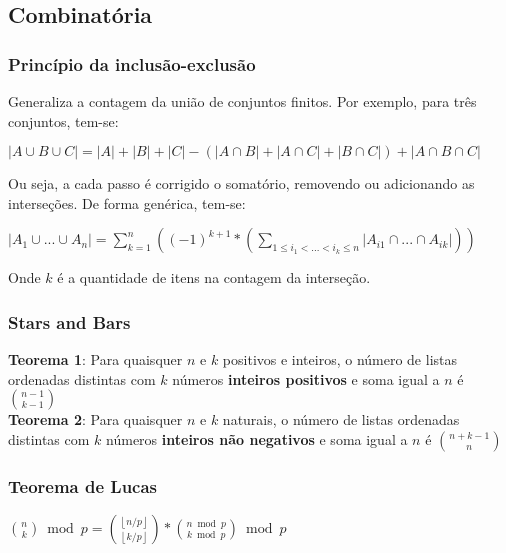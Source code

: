 \subsection{Combinat\'{o}ria}

\subsubsection{Princ\'{i}pio da inclus\~{a}o-exclus\~{a}o}
Generaliza a contagem da uni\~{a}o de conjuntos finitos. Por exemplo, para tr\^{e}s conjuntos, tem-se:

$|A \cup B \cup C| = |A| + |B| + |C| - (|A \cap B| + |A \cap C| + |B \cap C|) + |A \cap B \cap C|$

Ou seja, a cada passo \'{e} corrigido o somat\'{o}rio, removendo ou adicionando as interse\c{c}\~{o}es. De forma gen\'{e}rica, tem-se:

$|A_1 \cup ... \cup A_n| = \sum_{k=1}^{n} ((-1)^{k+1}*(\sum_{1 \leq i_1 < ... < i_k \leq n} |A_{i1} \cap ... \cap A_{ik}|))$

Onde $k$ \'{e} a quantidade de itens na contagem da interse\c{c}\~{a}o.

\divisor

\subsubsection{Stars and Bars}
\textbf{Teorema 1}: Para quaisquer $n$ e $k$ positivos e inteiros, o n\'{u}mero de listas ordenadas distintas com $k$ n\'{u}meros \textbf{inteiros positivos} e soma igual a $n$ \'{e} ${n-1 \choose k-1}$ \\

\textbf{Teorema 2}: Para quaisquer $n$ e $k$ naturais, o n\'{u}mero de listas ordenadas distintas com $k$ n\'{u}meros \textbf{inteiros n\~{a}o negativos} e soma igual a $n$ \'{e} ${n+k-1 \choose n}$

\divisor

\subsubsection{Teorema de Lucas}

${n \choose k} \bmod{p} = {\left \lfloor{n/p}\right \rfloor \choose \left \lfloor{k/p}\right \rfloor} * {n \bmod{p} \choose k \bmod{p}} \bmod{p}$




